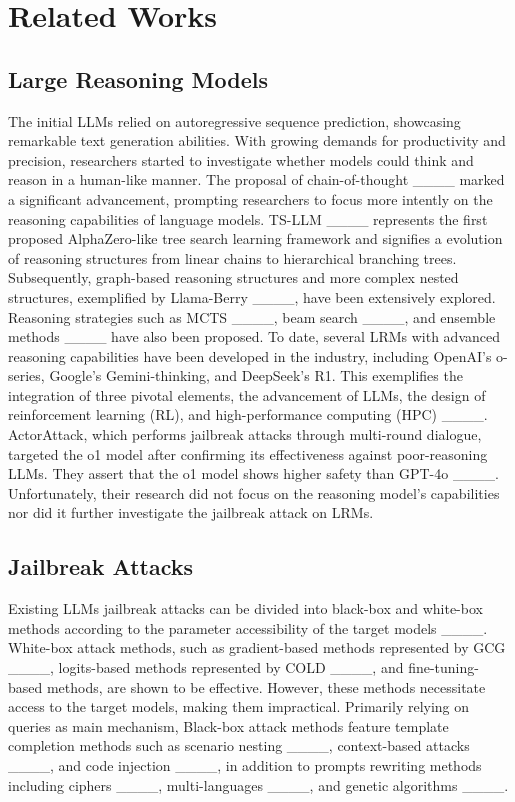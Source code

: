 \section{Related Works}
\subsection{Large Reasoning Models}

The initial LLMs relied on autoregressive sequence prediction, showcasing remarkable text generation abilities. With growing demands for productivity and precision, researchers started to investigate whether models could think and reason in a human-like manner. The proposal of chain-of-thought ____ marked a significant advancement, prompting researchers to focus more intently on the reasoning capabilities of language models. TS-LLM ____ represents the first proposed AlphaZero-like tree search learning framework and signifies a evolution of reasoning structures from linear chains to hierarchical branching trees. Subsequently, graph-based reasoning structures and more complex nested structures, exemplified by Llama-Berry ____, have been extensively explored. Reasoning strategies such as MCTS ____, beam search ____, and ensemble methods ____ have also been proposed. To date, several LRMs with advanced reasoning capabilities have been developed in the industry, including OpenAI's o-series, Google's Gemini-thinking, and DeepSeek's R1. This exemplifies the integration of three pivotal elements, the advancement of LLMs, the design of reinforcement learning (RL), and high-performance computing (HPC) ____. ActorAttack, which performs jailbreak attacks through multi-round dialogue, targeted the o1 model after confirming its effectiveness against poor-reasoning LLMs. They assert that the o1 model shows higher safety than GPT-4o ____. Unfortunately, their research did not focus on the reasoning model's capabilities nor did it further investigate the jailbreak attack on LRMs.

\subsection{Jailbreak Attacks}

Existing LLMs jailbreak attacks can be divided into black-box and white-box methods according to the parameter accessibility of the target models ____. White-box attack methods, such as gradient-based methods represented by GCG ____, logits-based methods represented by COLD ____, and fine-tuning-based methods, are shown to be effective. However, these methods necessitate access to the target models, making them impractical. Primarily relying on queries as main mechanism, Black-box attack methods feature template completion methods such as scenario nesting ____, context-based attacks ____, and code injection ____, in addition to prompts rewriting methods including ciphers ____, multi-languages ____, and genetic algorithms ____.

